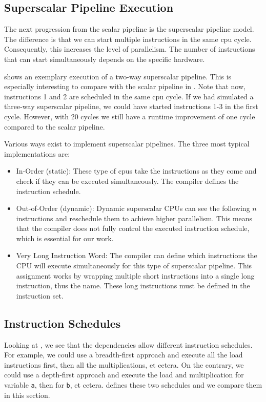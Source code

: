 \subsection{Superscalar Pipeline Execution}
\label{sec:bg:superscalar-cpu}
The next progression from the scalar pipeline is the superscalar pipeline model.
The difference is that we can start multiple instructions in the same \ac{cpu} cycle.
Consequently, this increases the level of parallelism.
The number of instructions that can start simultaneously depends on the specific hardware.

 shows an exemplary execution of a two-way superscalar pipeline.
This is especially interesting to compare with the scalar pipeline in .
Note that now, instructions 1 and 2 are scheduled in the same \ac{cpu} cycle.
If we had simulated a three-way superscalar pipeline, we could have started instructions 1-3 in the first cycle.
However, with 20 cycles we still have a runtime improvement of one cycle compared to the scalar pipeline.

Various ways exist to implement superscalar pipelines.
The three most typical implementations are:
\begin{itemize}
    \item In-Order (static): 
        These type of \acp{cpu} take the instructions as they come and check if they can be executed simultaneously.
        The compiler defines the instruction schedule.
    \item Out-of-Order (dynamic): 
        Dynamic superscalar CPUs can see the following $n$ instructions and reschedule them to achieve higher parallelism.
        This means that the compiler does not fully control the executed instruction schedule, which is essential for our work.
    \item Very Long Instruction Word: 
        The compiler can define which instructions the CPU will execute simultaneously for this type of superscalar pipeline.
        This assignment works by wrapping multiple short instructions into a single long instruction, thus the name.
        These long instructions must be defined in the instruction set.
\end{itemize}

\subsection{Instruction Schedules}
\label{sec:bg:cpu-schedule}
Looking at , we see that the dependencies allow different instruction schedules.
For example, we could use a breadth-first approach and execute all the load instructions first, then all the multiplications, et cetera.
On the contrary, we could use a depth-first approach and execute the load and multiplication for variable \lstinline|a|, then for \lstinline|b|, et cetera.
 defines these two schedules and we compare them in this section.

